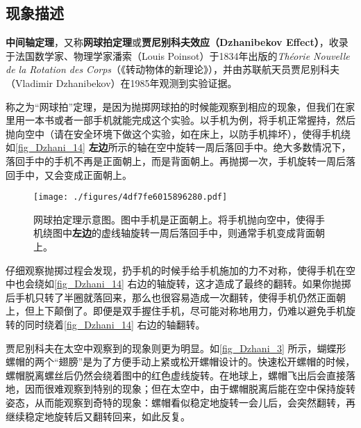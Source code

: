 



\subsection{现象描述}


\textbf{中间轴定理}，又称\textbf{网球拍定理}或\textbf{贾尼别科夫效应（Dzhanibekov Effect）}，收录于法国数学家、物理学家潘索（Louis Poinsot）于1834年出版的\textsl{Théorie Nouvelle de la Rotation des Corps}（《转动物体的新理论》），并由苏联航天员贾尼别科夫（Vladimir Dzhanibekov）在1985年观测到实验证据。


称之为“网球拍”定理，是因为抛掷网球拍的时候能观察到相应的现象，但我们在家里用一本书或者一部手机就能完成这个实验。以手机为例，将手机正常握持，然后抛向空中（请在安全环境下做这个实验，如在床上，以防手机摔坏），使得手机绕如\autoref{fig_Dzhani_14} \textbf{左边}所示的轴在空中旋转一周后落回手中。绝大多数情况下，落回手中的手机不再是正面朝上，而是背面朝上。再抛掷一次，手机旋转一周后落回手中，又会变成正面朝上。





\begin{figure}[ht]
\centering
\texttt{[image: ./figures/4df7fe6015896280.pdf]}
\caption{网球拍定理示意图。图中手机是正面朝上。将手机抛向空中，使得手机绕图中\textbf{左边}的虚线轴旋转一周后落回手中，则通常手机变成背面朝上。} \label{fig_Dzhani_14}
\end{figure}




仔细观察抛掷过程会发现，扔手机的时候手给手机施加的力不对称，使得手机在空中也会绕如\autoref{fig_Dzhani_14} 右边的轴旋转，这才造成了最终的翻转。如果你抛掷后手机只转了半圈就落回来，那么也很容易造成一次翻转，使得手机仍然正面朝上，但上下颠倒了。即便是双手握住手机，尽可能对称地用力，仍难以避免手机旋转的同时绕着\autoref{fig_Dzhani_14} 右边的轴翻转。


贾尼别科夫在太空中观察到的现象则更为明显。如\autoref{fig_Dzhani_3} 所示，蝴蝶形螺帽的两个“翅膀”是为了方便手动上紧或松开螺帽设计的。快速松开螺帽的时候，螺帽脱离螺丝后仍然会绕着图中的红色虚线旋转。在地球上，螺帽飞出后会直接落地，因而很难观察到特别的现象；但在太空中，由于螺帽脱离后能在空中保持旋转姿态，从而能观察到奇特的现象：螺帽看似稳定地旋转一会儿后，会突然翻转，再继续稳定地旋转后又翻转回来，如此反复。


